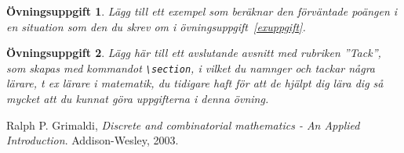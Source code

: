 \documentclass[12pt,a4wide]{article}
\theoremstyle{uppgiftsstil}
\newcommand{\ovningstext}{Övningsuppgift}
\newtheorem{ovning}{\ovningstext}
\newenvironment{uppgift}{\begin{framed}\begin{ovning}}%
                        {\end{ovning}\end{framed}}
\theoremstyle{avklaradstil}
\begin{document}
\begin{uppgift}
  Lägg till ett exempel som beräknar den förväntade poängen i en
  situation som den du skrev om i övningsuppgift~\ref{exuppgift}. 
\end{uppgift}

\begin{uppgift}
  Lägg här till ett avslutande avsnitt med rubriken ''Tack'', som
  skapas med kommandot \verb|\section|, i vilket
  du namnger och tackar några lärare, t ex lärare i matematik, du
  tidigare haft för att de hjälpt dig lära dig så mycket att du kunnat
  göra uppgifterna i denna övning. 
\end{uppgift}

\begin{thebibliography}{99}    %
    Ralph P. Grimaldi, \emph{Discrete and combinatorial mathematics -
    An Applied Introduction}. Addison-Wesley, 2003. 
\end{thebibliography}
\end{document}

